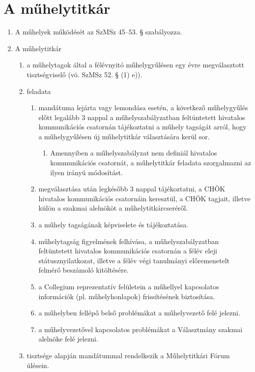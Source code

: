 \documentclass{../styles/rulebook}
\begin{document}
\section{A műhelytitkár}

\begin{enumerate}
	\item A műhelyek működését az SzMSz 45--53. § szabályozza.
    \item A műhelytitkár
	\begin{enumerate}
        \item a műhelytagok által a félévnyitó műhelygyűlésen egy évre megválasztott tisztségviselő (vö. SzMSz 52. § (1) e)).
        \item feladata
		\begin{enumerate}
            \item mandátuma lejárta vagy lemondása esetén, a következő műhelygyűlés előtt legalább 3 nappal a műhelyszabályzatban feltüntetett hivatalos kommunikációs csatornán tájékoztatni a műhely tagságát arról, hogy a műhelygyűlésen új műhelytitkár választására kerül sor.
			\begin{enumerate}
                \item Amennyiben a műhelyszabályzat nem definiál hivatalos kommunikációs csatornát, a műhelytitkár feladata szorgalmazni az ilyen irányú módosítást.
			\end{enumerate}
            \item megválasztása után legkésőbb 3 nappal tájékoztatni, a CHÖK hivatalos kommunikációs csatornáin keresztül, a CHÖK tagjait, illetve külön a szakmai alelnököt a műhelytitkárcseréről.
            \item a műhely tagságának képviselete és tájékoztatása.
            \item műhelytagság figyelmének felhívása, a műhelyszabályzatban feltüntetett hivatalos kommunikációs csatornán a félév eleji státusznyilatkozat, illetve a félév végi tanulmányi előremenetelt felmérő beszámoló kitöltésére.
            \item a Collegium reprezentatív felületein a műhellyel kapcsolatos információk (pl. műhelyhonlapok) frissítésének biztosítása.
            \item a műhelyben fellépő belső problémákat a műhelyvezető felé jelezni.
            \item a műhelyvezetővel kapcsolatos problémákat a Választmány szakmai alelnöke felé jelezni.
		\end{enumerate}
        \item tisztsége alapján mandátummal rendelkezik a Műhelytitkári Fórum ülésein.

\end{enumerate}
\end{enumerate}
\end{document}
